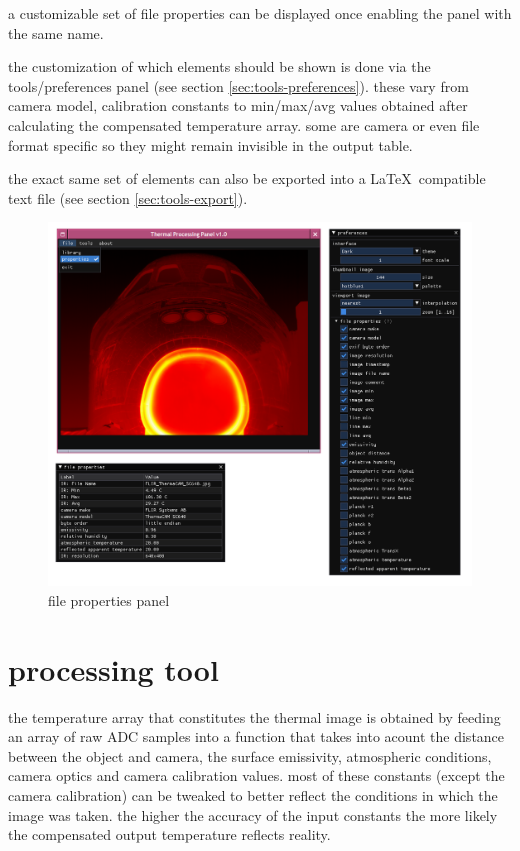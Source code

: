 \documentclass[12pt,twoside,a4paper,titlepage]{report}
\begin{document}
a customizable set of file properties can be displayed once enabling the panel with the same name.

the customization of which elements should be shown is done via the tools/preferences panel (see section \ref{sec:tools-preferences}). these vary from camera model, calibration constants to min/max/avg values obtained after calculating the compensated temperature array. some are camera or even file format specific so they might remain invisible in the output table.

the exact same set of elements can also be exported into a \LaTeX \ compatible text file (see section \ref{sec:tools-export}).

\begin{figure}[ht]
 \centering
 \includegraphics[width=14cm, keepaspectratio=true width=10cm]{img/file_properties}
 \caption{file properties panel}
 \label{fig:file-properties-overview}
\end{figure}


\section{processing tool} \label{sec:tools-processing}

the temperature array that constitutes the thermal image is obtained by feeding an array of raw ADC samples into a function that takes into acount the distance between the object and camera, the surface emissivity, atmospheric conditions, camera optics and camera calibration values. most of these constants (except the camera calibration) can be tweaked to better reflect the conditions in which the image was taken. the higher the accuracy of the input constants the more likely the compensated output temperature reflects reality.
\end{document}
